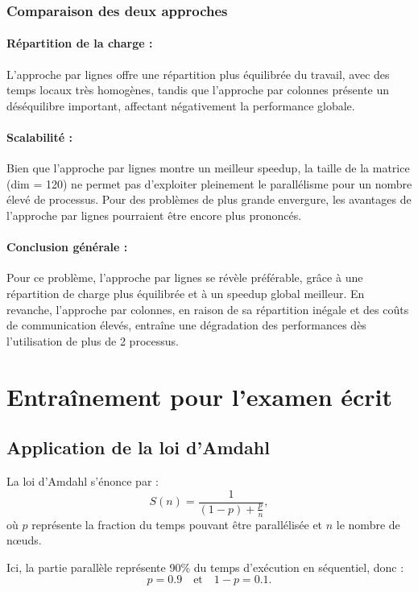 \documentclass[a4paper,13pt]{book}
\begin{document}
\subsubsection{Comparaison des deux approches}

\paragraph{Répartition de la charge :} 
L'approche par lignes offre une répartition plus équilibrée du travail, avec des temps locaux très homogènes, tandis que l'approche par colonnes présente un déséquilibre important, affectant négativement la performance globale.
\paragraph{Scalabilité :} 
Bien que l'approche par lignes montre un meilleur speedup, la taille de la matrice (dim = 120) ne permet pas d'exploiter pleinement le parallélisme pour un nombre élevé de processus. Pour des problèmes de plus grande envergure, les avantages de l'approche par lignes pourraient être encore plus prononcés.

\paragraph{Conclusion générale :} 
Pour ce problème, l'approche par lignes se révèle préférable, grâce à une répartition de charge plus équilibrée et à un speedup global meilleur. En revanche, l'approche par colonnes, en raison de sa répartition inégale et des coûts de communication élevés, entraîne une dégradation des performances dès l'utilisation de plus de 2 processus.

\clearpage
\section{Entraînement pour l'examen écrit}
\subsection{Application de la loi d'Amdahl}

La loi d’Amdahl s’énonce par :
\[
S(n) = \frac{1}{(1-p) + \frac{p}{n}},
\]
où \(p\) représente la fraction du temps pouvant être parallélisée et \(n\) le nombre de nœuds.

Ici, la partie parallèle représente 90\% du temps d’exécution en séquentiel, donc :
\[
p = 0.9 \quad \text{et} \quad 1-p = 0.1.
\]
\end{document}
